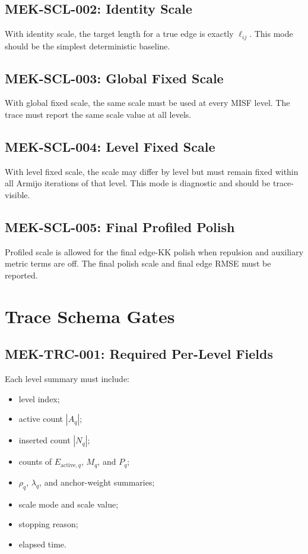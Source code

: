 \documentclass[11pt]{article}
\begin{document}
\subsection{MEK-SCL-002: Identity Scale}

With identity scale, the target length for a true edge is exactly \(\ell_{ij}\).
This mode should be the simplest deterministic baseline.

\subsection{MEK-SCL-003: Global Fixed Scale}

With global fixed scale, the same scale must be used at every MISF level. The
trace must report the same scale value at all levels.

\subsection{MEK-SCL-004: Level Fixed Scale}

With level fixed scale, the scale may differ by level but must remain fixed
within all Armijo iterations of that level. This mode is diagnostic and should
be trace-visible.

\subsection{MEK-SCL-005: Final Profiled Polish}

Profiled scale is allowed for the final edge-KK polish when repulsion and
auxiliary metric terms are off. The final polish scale and final edge RMSE must
be reported.

\section{Trace Schema Gates}

\subsection{MEK-TRC-001: Required Per-Level Fields}

Each level summary must include:
\begin{itemize}[leftmargin=2em]
  \item level index;
  \item active count \(|A_q|\);
  \item inserted count \(|N_q|\);
  \item counts of \(E_{\mathrm{active},q}\), \(M_q\), and \(P_q\);
  \item \(\rho_q\), \(\lambda_q\), and anchor-weight summaries;
  \item scale mode and scale value;
  \item stopping reason;
  \item elapsed time.
\end{itemize}
\end{document}
